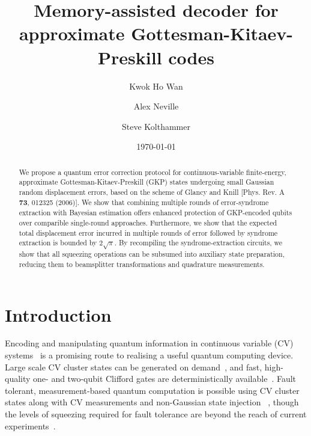 \documentclass[prx,reprint,superscriptaddress,longbibliography,floatfix,nofootinbib]{revtex4-1}
\begin{document}
 
\title{Memory-assisted decoder for approximate Gottesman-Kitaev-Preskill codes}

\author{Kwok Ho Wan}

\author{Alex Neville}

\author{Steve Kolthammer} 
\date{\today}

\begin{abstract}
We propose a quantum error correction protocol for continuous-variable finite-energy, approximate Gottesman-Kitaev-Preskill (GKP) states undergoing small Gaussian random displacement errors, based on the scheme of Glancy and Knill [Phys. Rev. A {\bf 73}, 012325 (2006)].
We show that combining multiple rounds of error-syndrome extraction with Bayesian estimation offers enhanced protection of GKP-encoded qubits over comparible single-round approaches.
Furthermore, we show that the expected total displacement error incurred in multiple rounds of error followed by syndrome extraction is bounded by $2\sqrt{\pi}$.
By recompiling the syndrome-extraction circuits, we show that all squeezing operations can be subsumed into auxiliary state preparation, reducing them to beamsplitter transformations and quadrature measurements.
\end{abstract}

\pacs{}

\maketitle

\section{Introduction} Encoding and manipulating quantum information in continuous variable (CV) systems~\cite{Lloyd1999, Braunstein2005, weedbrook2012gaussian} is a promising route to realising a useful quantum computing device.
Large scale CV cluster states can be generated on demand~\cite{furu_1_mil}, and fast, high-quality one- and two-qubit Clifford gates are deterministically available~\cite{furusawa2011quantum}.
Fault tolerant, measurement-based quantum computation is possible using CV cluster states along with CV measurements and non-Gaussian state injection ~\cite{Menicucci2014,2019arXiv190300012B}, though the levels of squeezing required for fault tolerance are beyond the reach of current experiments~\cite{Menicucci2014,PhysRevX.8.021054,2019arXiv190803579N,Fluhmann2019,2019arXiv190712487C}.
\end{document}

